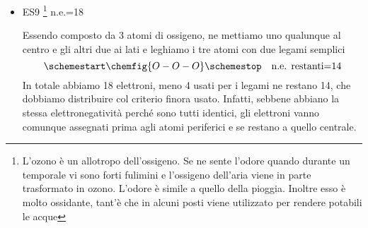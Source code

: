 \begin{itemize}
    Nel diossido di azoto i due ossigeni danno 12 elettroni, l'azoto 5, per un totale di 17 elettroni.
    L'azoto è l'atomo più elettronegativo tra i due, quindi lo mettiamo al centro e ai suoi lati poniamo gli ossigeni, che leghiamo all'azoto con due legami semplici:
    $$\schemestart
    \chemfig{O-N-O}
    \schemestop
    \quad
    \text{n.e. restanti=13}
    $$
    Abbiamo consumato 4 elettroni, ne restano 13 che distribuiamo attorno agli atomi esterni, perché più elettronegativi. Assegnando una coppia per volta alternando gli ossigeni fino a che questi raggiungano l'ottetto, consumiamo 12 elettroni (3 coppie per atomo). L'elettrone restante viene assegnato all'azoto centrale:
    $$\schemestart
    \chemfig{@{x1}{\charge{[circle]90=\:,180=\:,270=\:}{O}}-[@{x2}]\charge{[circle]90=\.}{N}-\charge{[circle]0=\:,90=\:,270=\:}{O}}
    \schemestop
    \chemmove[shorten <=4pt, shorten >=4pt]{
    \draw(x1.110)..controls +(60:0.5cm)and+(90:0.5cm)..(x2);
    }$$
    In questo modo l'azoto ha 5 elettroni. Avendo attorno a sé un numero dispari di elettroni possiamo già prevedere che non raggiungerà l'ottetto. L'unica cosa che si può fare è prendere un doppietto qualunque di uno dei due ossigeni e trasformalo in doppio legame:
    $$\schemestart
    \chemfig{\charge{[circle]180=\:,270=\:}{O}=\charge{[circle]90=\.}{N}-\charge{[circle]0=\:,90=\:,270=\:}{O}}
    \schemestop
    $$
    In questo modo l'ossigeno di sinistra ha raggiunto l'ottetto (4 dai doppietti più 4 dai legami), quello di destra pure (6 dai doppietti e 2 dal legame), ma l'azoto ha solo 7 elettroni (4 dal doppio legame, 2 dal legame singolo e 1 spaiato). Non possiamo fare altro.

    Tuttavia questo formalismo ci suggerisce che questa molecola, avendo un elettrone spaiato, mostrerà proprietà paramagnetiche.
    \newpage
    \item ES9 \footnote{L'ozono è un allotropo dell'ossigeno. Se ne sente l'odore quando durante un temporale  vi sono forti fulimini e l'ossigeno dell'aria viene in parte trasformato in ozono. L'odore è simile a quello della pioggia. Inoltre esso è molto ossidante, tant'è che in alcuni posti viene utilizzato per rendere potabili le acque} n.e.=18
    
    Essendo composto da 3 atomi di ossigeno, ne mettiamo uno qualunque al centro e gli altri due ai lati e leghiamo i tre atomi con due legami semplici
    $$\schemestart
    \chemfig{O-O-O}
    \schemestop
    \quad
    \text{n.e. restanti=14}
    $$
    In totale abbiamo 18 elettroni, meno 4 usati per i legami ne restano 14, che dobbiamo distribuire col criterio finora usato. Infatti, sebbene abbiano la stessa elettronegatività perché sono tutti identici, gli elettroni vanno comunque assegnati prima agli atomi periferici e se restano a quello centrale.
    

\end{itemize}
